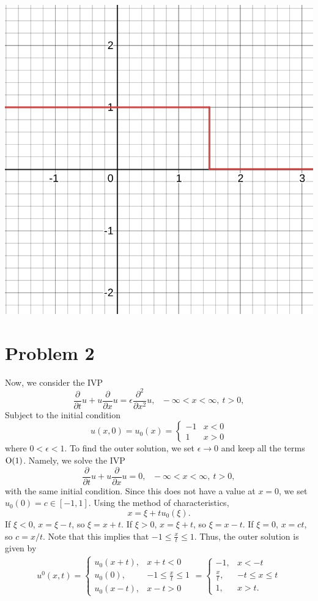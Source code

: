 \documentclass{article}
\begin{document}
\includegraphics[scale=0.4]{graph5.png}\\

\section{Problem 2}
Now, we consider the IVP 
	\[
	\frac{\partial }{\partial t}u+u\frac{\partial }{\partial x}u= \epsilon \frac{\partial^2 }{\partial x^2}u, ~~~ - \infty < x < \infty, ~ t > 0,
\]
Subject to the initial condition
\[
u(x,0) =u_0(x)= \begin{cases}
	- 1 & x < 0 \\
	1 & x > 0 
\end{cases}
\]
where $0<\epsilon<1$. To find the outer solution, we set $\epsilon\to0$ and keep all the terms $\operatorname{O}(1)$. Namely, we solve the IVP
\[
\frac{\partial }{\partial t}u+u\frac{\partial }{\partial x}u= 0, ~~~ - \infty < x < \infty, ~ t > 0,
\]
with the same initial condition. Since this does not have a value at $x=0$, we set $u_0(0)=c\in[-1,1]$. Using the method of characteristics,
\[
x=\xi+tu_0(\xi).
\]
If $\xi<0$, $x=\xi-t$, so $\xi=x+t$. If $\xi>0$, $x=\xi+t$, so $\xi=x-t$. If $\xi=0$, $x=ct$, so $c=x/t$. Note that this implies that $-1\leq \frac{x}{t}\leq1$. Thus, the outer solution is given by
\begin{align*}
u^0(x,t)=
\begin{cases}
	u_0(x+t), &x+t<0\\
	u_0(0), &-1\leq \frac{x}{t}\leq1\\
	u_0(x-t), &x-t>0
\end{cases}=
\begin{cases}
	-1, &x<-t\\
	\frac{x}{t}, &-t\leq x\leq t\\
	1, &x>t.
\end{cases}
\end{align*} 
\end{document}
